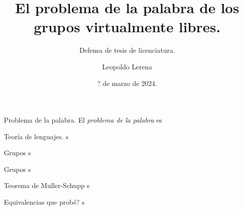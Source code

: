 \documentclass[aspectratio=169, 11pt]{beamer}
\title{El problema de la palabra de los grupos virtualmente libres.}
\subtitle{Defensa de tesis de licenciatura.}
\date{? de marzo de 2024.}
\author{Leopoldo Lerena}
\institute{Universidad de Buenos Aires}
\begin{document}
	\maketitle
	
	\begin{frame}[fragile]{Problema de la palabra.}
		El \emph{problema de la palabra} es 
		
	\end{frame}
	
	\begin{frame}[fragile]{Teoría de lenguajes.}
		s
	\end{frame}

	
	\begin{frame}[fragile]{Grupos \ic}
		s	
	\end{frame}
	
	\begin{frame}[fragile]{Grupos \vl}
		s
	\end{frame}
	
	\begin{frame}[fragile]{Teorema de Muller-Schupp}
		s
	\end{frame}	
	
	\begin{frame}[fragile]{Equivalencias que probé?}
		s
	\end{frame}
	
	
	
	
	
	
	
	
	
	
	
	
\end{document}
